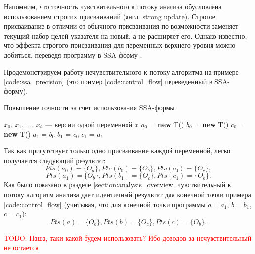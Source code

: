 \documentclass[14pt,titlepage]{extarticle}
\newcommand{\NEW}{\textbf{new }}
\newcommand{\todo}[1]{\textcolor{red}{TODO: #1}}
\newcommand{\eng}[1]{{\English#1}}
\begin{document}
      Напомним, что точность чувствительного к потоку анализа обусловлена
      использованием строгих присваиваний (англ. \eng{strong update}).
      Строгое присваивание в отличии от обычного присваивания по возможности
      заменяет текущий набор целей указателя на новый, а не расширяет его.
      Однако известно, что эффекта строгого присваивания для переменных
      верхнего уровня можно добиться, переведя программу в SSA-форму
      \cite{points_to_with_efficient_strong_updates}.

      Продемонстрируем работу нечувствительного к потоку алгоритма на примере
      \ref{code:ssa_precision} (это пример \ref{code:control_flow} переведенный
      в SSA-форму).
      \begin{algorithm}
        \caption{Повышение точности за счет использования SSA-формы}
        \label{code:ssa_precision}
        \begin{algorithmic}[1]
          \REQUIRE $x_0$, $x_1$, ..., $x_i$~--- версии одной переменной $x$
          \STATE $a_0$ = \NEW T()
          \STATE $b_0$ = \NEW T()
          \STATE $c_0$ = \NEW T()
          \STATE $a_1$ = $b_0$
          \STATE $b_1$ = $c_0$
          \STATE $c_1$ = $a_1$
        \end{algorithmic}
      \end{algorithm}

      Так как присутствует только одно присваивание каждой переменной, легко
      получается следующий результат:
      \[Pts(a_0) = \{O_a\}, Pts(b_0) = \{O_b\}, Pts(c_0) = \{O_c\},\]
      \[Pts(a_1) = \{O_b\}, Pts(b_1) = \{O_c\}, Pts(c_1) = \{O_b\}.\]
      Как было показано в разделе \ref{section:analysis_overview}
      чувствительный к
      потоку алгоритм анализа дает идентичный результат для конечной точки
      примера \ref{code:control_flow} (учитывая, что для конечной точки
      программы $a = a_1$, $b = b_1$, $c = c_1$):
      \[Pts(a) = \{O_b\}, Pts(b) = \{O_c\}, Pts(c) = \{O_b\}.\]

      \todo{Паша, таки какой будем использовать? Ибо доводов за
      нечувствительный не остается}
\end{document}
